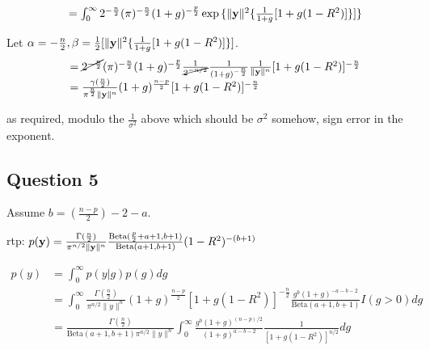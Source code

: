 \documentclass{amsart}[12pt]
\theoremstyle{definition}
\begin{document}
\begin{equation*}
	\begin{array}{ll}
		  & = \int_0^\infty 2^{-\frac{n}{2}} (\pi)^{-\frac{n}{2}} (1 + g)^{-\frac{p}{2}} \exp{\{ \| {\bf y}\|^2 \{ \frac{1}{1 + g} [1 + g(1 - R^2)] \}} ] \} 
	\end{array}
\end{equation*}

Let $\alpha = -\frac{n}{2}, \beta = \tfrac{1}{2} [\| {\bf y} \|^2 \{ \frac{1}{1 + g} [1 + g(1 - R^2)] \}]$.
\begin{equation*}
	\begin{array}{ll}
		  & = \cancel{2^{- \frac{n}{2}}} (\pi)^{-\frac{n}{2}} (1 + g)^{-\frac{p}{2}} \frac{1}{\cancel{2^{-n/2}}} \frac{1}{(1 + g)^{-\frac{n}{2}}} \frac{1}{\| {\bf y} \|^n} [1 + g(1 - R^2)]^{-\frac{n}{2}} \\
		  & = \frac{\gamma(\frac{n}{2})}{\pi^{\frac{n}{2}} \| {\bf y} \|^n} (1 + g)^{\frac{n - p}{2}} [1 + g(1 - R^2)]^{-\frac{n}{2}}                                                                       
	\end{array}
\end{equation*}

as required, modulo the $\frac{1}{\sigma^2}$ above which should be $\sigma^2$ somehow, sign error in the
exponent.

\subsection{Question 5}

Assume $b = (\frac{n - p}{2}) - 2 - a$.

rtp: $p({\bf y}) = \frac{\Gamma(\frac{n}{2})}{\pi^{n/2} \| {\bf y} \|^n} \frac{\text{Beta}(\frac{p}{2} + a + 1, b + 1)}{\text{Beta}(a + 1, b + 1)} (1 - R^2)^{-(b + 1)}$

\begin{equation*}
	\begin{array}{ll}
		p(y) & = \int_0^\infty p(y|g) p(g) dg                                                                                                                                                                  \\
		     & = \int_0^\infty \frac{\Gamma(\frac{n}{2})}{\pi^{n/2} \| y \|^n} (1 + g)^{\frac{n - p}{2}}[1 + g(1 - R^2)]^{-\frac{n}{2}} \frac{g^b (1 + g)^{-a - b - 2}}{\text{Beta}(a + 1, b + 1)} I(g > 0) dg \\
		     & = \frac{\Gamma(\frac{n}{2})}{\text{Beta}(a + 1, b + 1) \pi^{n/2} \| y \|^n}                                                                                                                     
		\int_0^\infty \frac{g^b (1 + g)^{(n - p)/2}}{(1 + g)^{a - b - 2}} \frac{1}{[1 + g(1 - R^2)]^{n/2}} dg
	\end{array}
\end{equation*}
\end{document}

